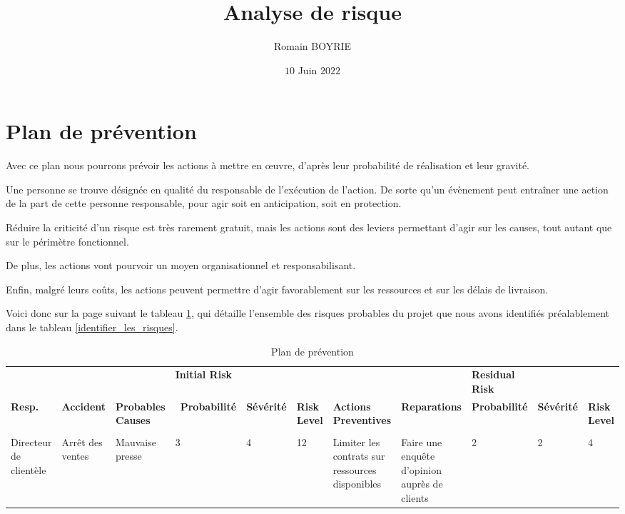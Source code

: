 \documentclass[12pt]{article}
\title{Analyse de risque}
\author{Romain BOYRIE}
\date{$10$ Juin $2022$}
\begin{document}
\maketitle

\setcounter{tocdepth}{2} 

\tableofcontents 

\listoffigures

\listoftables 

\newpage
\section{Plan de prévention}
Avec ce plan nous pourrons prévoir les actions à mettre en œuvre, d’après leur probabilité de réalisation et leur gravité.

Une personne se trouve désignée en qualité du responsable de l’exécution de l’action. De sorte qu’un évènement peut entraîner une action de la part de cette personne responsable, pour agir soit en anticipation, soit en protection.

Réduire la criticité d’un risque est très rarement gratuit, mais les actions sont des leviers permettant d’agir sur les causes, tout autant que sur le périmètre fonctionnel.

De plus, les actions vont pourvoir un moyen organisationnel et responsabilisant.

Enfin, malgré leurs coûts, les actions peuvent permettre d’agir favorablement sur les ressources et sur les délais de livraison. 

Voici donc sur la page suivant le tableau \ref{plan_de_prevention}, qui détaille l’ensemble des risques probables du projet que nous avons identifiés préalablement dans le tableau \ref{identifier_les_risques}.

\begin{landscape}
\begin{table}[H]
\scriptsize
\caption{Plan de prévention}
\begin{tabular}{p{1cm} p{2cm} p{2cm} p{1.5cm} p{1cm}p{1cm}p{4cm}p{3.3cm} p{1.3cm}p{1cm} p{1cm}}
\hline & & & \bf Initial Risk & & & &&\bf Residual Risk & & \\ [5pt]
 \bf Resp.  & \bf Accident & \bf Probables Causes & \ \bf Probabilité & \bf Sévérité & \bf Risk Level & \bf Actions Preventives& \bf Reparations & \bf Probabilité &\bf Sévérité & \bf Risk Level \\
\hline
&&&&&&&&&&\\
 Directeur de clientèle  & Arrêt des ventes & Mauvaise presse & 3 & 4 & \cellcolor{red!50} 12 & Limiter les contrats sur ressources disponibles & Faire une enquête d’opinion auprès de clients & 2& 2& \cellcolor{green!50} 4 \\ 
\hline
\end{tabular}
\label{plan_de_prevention}
\end{table}
\end{landscape}
\end{document}
